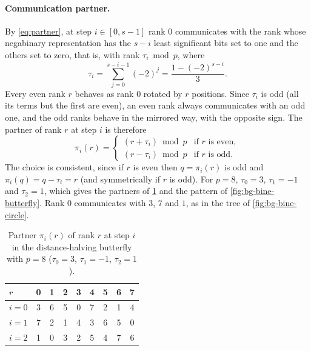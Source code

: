 \paragraph{Communication partner.}
By \cref{eq:partner}, at step $i\in[0,s-1]$ rank $0$ communicates with the rank whose negabinary representation has the $s-i$ least significant bits set to one and the others set to zero, that is, with rank $\tau_i \bmod p$, where
\begin{equation}
  \tau_i=\sum_{j=0}^{s-i-1}(-2)^j=\frac{1-(-2)^{s-i}}{3}.
  \label{eq:bg-bine-tau}
\end{equation}
Every even rank $r$ behaves as rank $0$ rotated by $r$ positions.
Since $\tau_i$ is odd (all its terms but the first are even), an even rank always communicates with an odd one, and the odd ranks behave in the mirrored way, with the opposite sign.
The partner of rank $r$ at step $i$ is therefore
\begin{equation}
  \pi_i(r)=
  \begin{cases}
    (r+\tau_i)\bmod p & \text{if $r$ is even},\\
    (r-\tau_i)\bmod p & \text{if $r$ is odd}.
  \end{cases}
  \label{eq:bg-bine-bfly-partner}
\end{equation}
The choice is consistent, since if $r$ is even then $q=\pi_i(r)$ is odd and $\pi_i(q)=q-\tau_i=r$ (and symmetrically if $r$ is odd).
For $p=8$, $\tau_0=3$, $\tau_1=-1$ and $\tau_2=1$, which gives the partners of \cref{tab:bg-bine-bfly-p8} and the pattern of \cref{fig:bg-bine-butterfly}.
Rank $0$ communicates with $3$, $7$ and $1$, as in the \bine{} tree of \cref{fig:bg-bine-circle}.

\begin{table}[t]
\centering
\small
\caption{Partner $\pi_i(r)$ of rank $r$ at step $i$ in the distance-halving \bine{} butterfly with $p=8$ ($\tau_0=3$, $\tau_1=-1$, $\tau_2=1$).}
\label{tab:bg-bine-bfly-p8}
\begin{tabular}{@{}l*{8}{c}@{}}
\toprule
$r$ & 0 & 1 & 2 & 3 & 4 & 5 & 6 & 7 \\
\midrule
$i=0$ & 3 & 6 & 5 & 0 & 7 & 2 & 1 & 4 \\
$i=1$ & 7 & 2 & 1 & 4 & 3 & 6 & 5 & 0 \\
$i=2$ & 1 & 0 & 3 & 2 & 5 & 4 & 7 & 6 \\
\bottomrule
\end{tabular}
\end{table}

